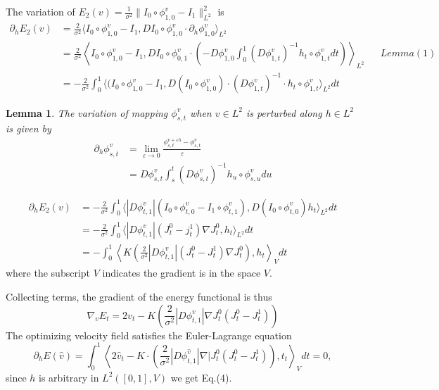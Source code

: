 \documentclass{article}
\theoremstyle{definition}
\theoremstyle{plain}
\newtheorem{lemma}{Lemma}
\begin{document}
The variation of $E_2(v)=\frac{1}{\sigma^2}\|I_0\circ\phi^v_{1,0}-I_1\|^2_{L^2}$ is
\begin{align*}
    \partial_hE_2(v)&=\frac{2}{\sigma^2}\langle I_0\circ\phi^v_{1,0}-I_1,DI_0\circ\phi^v_{1,0}\cdot\partial_h\phi^v_{1,0}\rangle_{L^2}\\
    &=\frac{2}{\sigma^2}\left< I_0\circ\phi^v_{1,0}-I_1,DI_0\circ\phi^v_{0,1}\cdot\left(-D\phi^v_{1,0}\int^1_0(D\phi^v_{1,t})^{-1}h_t\circ\phi^v_{1,t}dt\right)\right>_{L^2} &&Lemma (1)\\
    &=-\frac{2}{\sigma^2}\int^1_0\langle(I_0\circ\phi^v_{1,0}-I_1,D(I_0\circ\phi^v_{1,0})\cdot(D\phi^v_{1,t})^{-1}\cdot h_t\circ\phi^v_{1,t}\rangle_{L^2}dt
\end{align*}
\begin{lemma}
The variation of mapping $\phi^v_{s,t}$ when $v\in L^2$ is perturbed along $h\in L^2$ is given by
\begin{align*}
    \partial_h\phi^v_{s,t}&=\lim_{\varepsilon\rightarrow0}\frac{\phi^{v+\varepsilon h}_{s,t}-\phi^v_{s,t}}{\varepsilon}\\
    &=D\phi^v_{s,t}\int^t_s(D\phi^v_{s,t})^{-1}h_u\circ\phi^v_{s,u}du
\end{align*}
\end{lemma}
\begin{align*}
    \partial_hE_2(v)&=-\frac{2}{\sigma^2}\int^1_0\langle|D\phi^v_{t,1}|(I_0\circ\phi^v_{t,0}-I_1\circ\phi^v_{t,1}),D(I_0\circ\phi^v_{t,0})h_t\rangle_{L^2}dt\\
    &=-\frac{2}{\sigma^2}\int^1_0\langle|D\phi^v_{t,1}|(J^0_t-j^1_t)\nabla J^0_t,h_t\rangle_{L^2}dt\\
    &=-\int^1_0\left< K\left(\frac{2}{\sigma^2}|D\phi^v_{t,1}|(J^0_t-J^1_t)\nabla J^0_t\right),h_t\right>_Vdt
\end{align*}
where the subscript $V$ indicates the gradient is in the space $V$.

Collecting terms, the gradient of the energy functional is thus
\begin{equation*}
    \nabla_vE_t=2v_t-K\left(\frac{2}{\sigma^2}|D\phi^v_{t,1}|\nabla J^0_t(J^0_t-J^1_t)\right )
\end{equation*}
The optimizing velocity field satisfies the Euler-Lagrange equation
\begin{equation*}
    \partial_hE(\hat{v})=\int^1_0\left<2\hat{v}_t-K\cdot\left(\frac{2}{\sigma^2}|D\phi^\hat{v}_{t,1}|\nabla|J^0_t(J^0_t-J^1_t)\right),t_t\right>_Vdt=0,
\end{equation*}
since $h$ is arbitrary in $L^2([0,1],V)$ we get Eq.(4).
\end{document}
